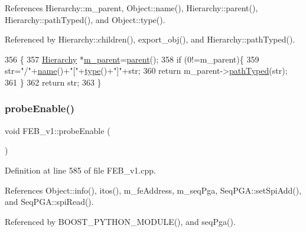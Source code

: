 References Hierarchy\+::m\+\_\+parent, Object\+::name(), Hierarchy\+::parent(), Hierarchy\+::path\+Typed(), and Object\+::type().



Referenced by Hierarchy\+::children(), export\+\_\+obj(), and Hierarchy\+::path\+Typed().


\begin{DoxyCode}
356                                            \{
357   \hyperlink{classHierarchy}{Hierarchy} *\hyperlink{classHierarchy_a5814bb280d4e8539ab25ab6cbfb9cc4f}{m\_parent}=\hyperlink{classHierarchy_a1c7bec8257e717f9c1465e06ebf845fc}{parent}();
358   \textcolor{keywordflow}{if} (0!=m\_parent)\{
359     str=\textcolor{stringliteral}{"/"}+\hyperlink{classObject_a300f4c05dd468c7bb8b3c968868443c1}{name}()+\textcolor{stringliteral}{"["}+\hyperlink{classObject_a84f99f70f144a83e1582d1d0f84e4e62}{type}()+\textcolor{stringliteral}{"]"}+str;
360     \textcolor{keywordflow}{return} m\_parent->\hyperlink{classHierarchy_a1efd56cd164d328d2002e53a10a19b8c}{pathTyped}(str);
361   \}
362   \textcolor{keywordflow}{return} str;
363 \}
\end{DoxyCode}
\mbox{\label{classFEB__v1_aa9a047f616c6affac88a8d9ec984013f}} 
\subsubsection{\texorpdfstring{probe\+Enable()}{probeEnable()}}
{\footnotesize\ttfamily void F\+E\+B\+\_\+v1\+::probe\+Enable (\begin{DoxyParamCaption}{ }\end{DoxyParamCaption})}



Definition at line 585 of file F\+E\+B\+\_\+v1.\+cpp.



References Object\+::info(), itos(), m\+\_\+fe\+Address, m\+\_\+seq\+Pga, Seq\+P\+G\+A\+::set\+Spi\+Add(), and Seq\+P\+G\+A\+::spi\+Read().



Referenced by B\+O\+O\+S\+T\+\_\+\+P\+Y\+T\+H\+O\+N\+\_\+\+M\+O\+D\+U\+L\+E(), and seq\+Pga().


